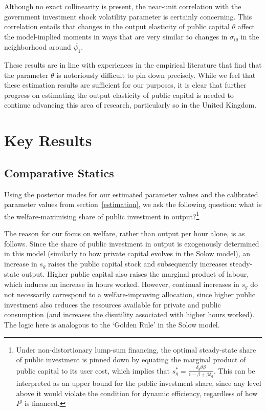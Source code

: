 \documentclass[titlepage, 11pt, a4paper]{article}
\renewcommand{\&}{and}
\begin{document}
Although no exact collinearity is present, the near-unit correlation with the government investment shock volatility parameter 
is certainly concerning. This correlation entails that changes in the output elasticity of public capital $\theta$ affect the model-implied moments in ways that are very similar to changes in $\sigma_{ig}$ in the neighborhood around $\bar{\psi_1}$. 

These results are in line with experiences in the empirical literature that find that the parameter $\theta$ is notoriously difficult to pin down precisely. While we feel that these estimation results are sufficient for our purposes, it is clear that further progress on estimating the output elasticity of public capital is needed to continue advancing this area of research, particularly so in the United Kingdom. 
 



\section{Key Results} \label{simulation}

\subsection{Comparative Statics}
Using the posterior modes for our estimated parameter values and the calibrated parameter values from section~\ref{estimation}, we ask the following question: what is the welfare-maximising share of public investment in output?\footnote{Under non-distortionary lump-sum financing, the optimal steady-state share of public investment is pinned down by equating the marginal product of public capital to its user cost, which implies that $ s_g^*=\frac{\delta_g\theta\beta}{1-\beta+\beta\delta_g}.$ This can be interpreted as an upper bound for the public investment share, since any level above it would violate the condition for dynamic efficiency, regardless of how $I^{g}$ is financed.}

The reason for our focus on welfare, rather than output per hour alone, is as follows. Since the share of public investment in output is exogenously determined in this model (similarly to how private capital evolves in the Solow model), an increase in $s_g$ raises the public capital stock and subsequently increases steady-state output. Higher public capital also raises the marginal product of labour, which induces an increase in hours worked. However, continual increases in $s_g$ do not necessarily correspond to a welfare-improving allocation, since higher public investment also reduces the resources available for private and public consumption (and increases the disutility associated with higher hours worked). The logic here is analogous to the `Golden Rule' in the Solow model. 
\end{document}
